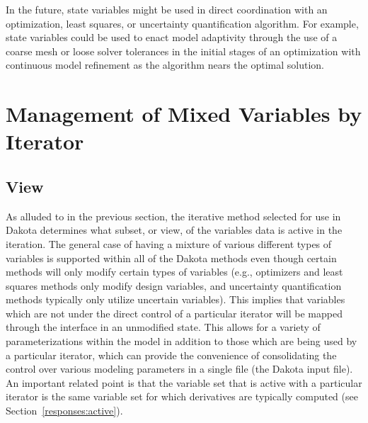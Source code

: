 In the future, state variables might be used in direct coordination
with an optimization, least squares, or uncertainty quantification
algorithm. For example, state variables could be used to enact model
adaptivity through the use of a coarse mesh or loose solver tolerances
in the initial stages of an optimization with continuous model
refinement as the algorithm nears the optimal solution.

\section{Management of Mixed Variables by Iterator}\label{variables:mixed}

\subsection{View}\label{variables:mixedview}
As alluded to in the previous section, the iterative method selected
for use in Dakota determines what subset, or view, of the variables
data is active in the iteration. The general case of having a mixture
of various different types of variables is supported within all of the
Dakota methods even though certain methods will only modify certain
types of variables (e.g., optimizers and least squares methods only
modify design variables, and uncertainty quantification methods 
typically only utilize uncertain variables).  
This implies that variables which are not under the
direct control of a particular iterator will be mapped through the
interface in an unmodified state. This allows for a variety of
parameterizations within the model in addition to those which are
being used by a particular iterator, which can provide the convenience
of consolidating the control over various modeling parameters in a
single file (the Dakota input file). An important related point is
that the variable set that is active with a particular iterator is the
same variable set for which derivatives are typically computed (see
Section~\ref{responses:active}).

